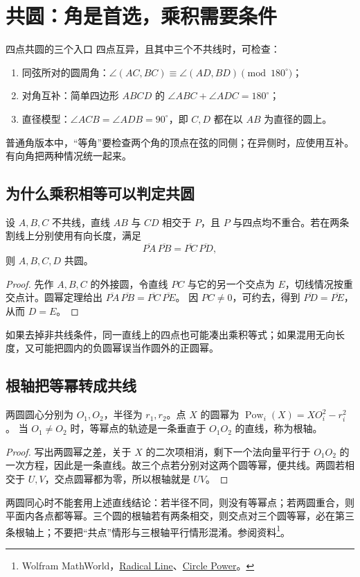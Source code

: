\documentclass[lang=cn,12pt,fontset=none,a4paper,openany]{beautybook}
\begin{document}
\section{共圆：角是首选，乘积需要条件}
\begin{keybox}{四点共圆的三个入口}
四点互异，且其中三个不共线时，可检查：
\begin{enumerate}
\item 同弦所对的圆周角：$\angle(AC,BC)\equiv\angle(AD,BD)\pmod{180^\circ}$；
\item 对角互补：简单四边形 $ABCD$ 的 $\angle ABC+\angle ADC=180^\circ$；
\item 直径模型：$\angle ACB=\angle ADB=90^\circ$，即 $C,D$ 都在以 $AB$ 为直径的圆上。
\end{enumerate}
普通角版本中，“等角”要检查两个角的顶点在弦的同侧；在异侧时，应使用互补。有向角把两种情况统一起来。
\end{keybox}

\subsection{为什么乘积相等可以判定共圆}
设 $A,B,C$ 不共线，直线 $AB$ 与 $CD$ 相交于 $P$，且 $P$ 与四点均不重合。若在两条割线上分别使用有向长度，满足
\[
 \overline{PA}\,\overline{PB}=\overline{PC}\,\overline{PD},
\]
则 $A,B,C,D$ 共圆。
\begin{proof}
先作 $A,B,C$ 的外接圆，令直线 $PC$ 与它的另一个交点为 $E$，切线情况按重交点计。圆幂定理给出
$\overline{PA}\,\overline{PB}=\overline{PC}\,\overline{PE}$。
因 $PC\ne0$，可约去，得到 $\overline{PD}=\overline{PE}$，从而 $D=E$。
\end{proof}
如果去掉非共线条件，同一直线上的四点也可能凑出乘积等式；如果混用无向长度，又可能把圆内的负圆幂误当作圆外的正圆幂。

\subsection{根轴把等幂转成共线}
两圆圆心分别为 $O_1,O_2$，半径为 $r_1,r_2$。点 $X$ 的圆幂为
$\operatorname{Pow}_i(X)=XO_i^2-r_i^2$。
当 $O_1\ne O_2$ 时，等幂点的轨迹是一条垂直于 $O_1O_2$ 的直线，称为根轴。
\begin{proof}
写出两圆幂之差，关于 $X$ 的二次项相消，剩下一个法向量平行于 $O_1O_2$ 的一次方程，因此是一条直线。故三个点若分别对这两个圆等幂，便共线。两圆若相交于 $U,V$，交点圆幂都为零，所以根轴就是 $UV$。
\end{proof}
两圆同心时不能套用上述直线结论：若半径不同，则没有等幂点；若两圆重合，则平面内各点都等幂。三个圆的根轴若有两条相交，则交点对三个圆等幂，必在第三条根轴上；不要把“共点”情形与三根轴平行情形混淆。参阅资料\footnote{Wolfram MathWorld，\href{https://mathworld.wolfram.com/RadicalLine.html}{Radical Line}、\href{https://mathworld.wolfram.com/CirclePower.html}{Circle Power}。}。
\end{document}

